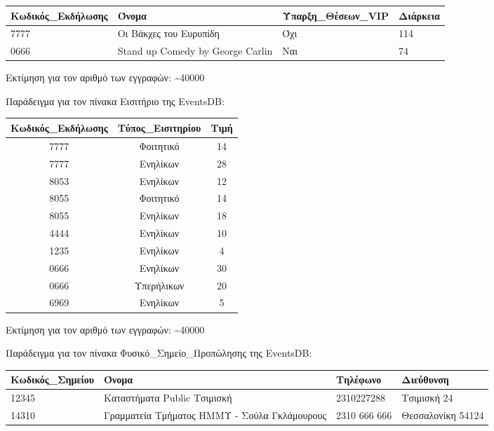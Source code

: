 \begin{table}[H]
  \centering
  \footnotesize
  \begin{tabular}{|p{3cm}|p{4cm}|p{3cm}|p{3cm}|}
  \hline
  Κωδικός\_Εκδήλωσης & Όνομα & Ύπαρξη\_Θέσεων\_VIP & Διάρκεια \\ \hline
  7777 & Οι Βάκχες του Ευρυπίδη & Όχι & 114 \\ \hline
  0666 & Stand up Comedy by George Carlin & Ναι & 74 \\ \hline
\end{tabular}
\end{table}
  
Εκτίμηση για τον αριθμό των εγγραφών: \textasciitilde 40000

Παράδειγμα για τον πίνακα Εισιτήριο της EventsDB:

\begin{table}[H]
  \centering
  \footnotesize
  \begin{tabular}{|c|c|c|}
  \hline
  Κωδικός\_Εκδήλωσης & Τύπος\_Εισιτηρίου & Τιμή \\ \hline
  7777 & Φοιτητικό & 14 \\ \hline
  7777 & Ενηλίκων & 28 \\ \hline
  8053 & Ενηλίκων & 12 \\ \hline
  8055 & Φοιτητικό & 14 \\ \hline
  8055 & Ενηλίκων & 18 \\ \hline
  4444 & Ενηλίκων & 10 \\ \hline
  1235 & Ενηλίκων & 4 \\ \hline
  0666 & Ενηλίκων & 30 \\ \hline
  0666 & Υπερήλικων & 20 \\ \hline
  6969 & Ενηλίκων & 5 \\ \hline
\end{tabular}
\end{table}
  
Εκτίμηση για τον αριθμό των εγγραφών: \textasciitilde 40000

Παράδειγμα για τον πίνακα Φυσικό\_Σημείο\_Προπώλησης της EventsDB:

\begin{table}[H]
  \centering
  \footnotesize
  \begin{tabular}{|p{3cm}|p{4cm}|p{3cm}|p{3cm}|}
  \hline
  Κωδικός\_Σημείου & Όνομα & Τηλέφωνο & Διεύθυνση \\ \hline
  12345 & Καταστήματα Public Τσιμισκή & 2310227288 & Τσιμισκή 24 \\ \hline
  14310 & Γραμματεία Τμήματος ΗΜΜΥ - Σούλα Γκλάμουρους & 2310 666 666 & Θεσσαλονίκη 54124 \\ \hline
\end{tabular}
\end{table}
  
